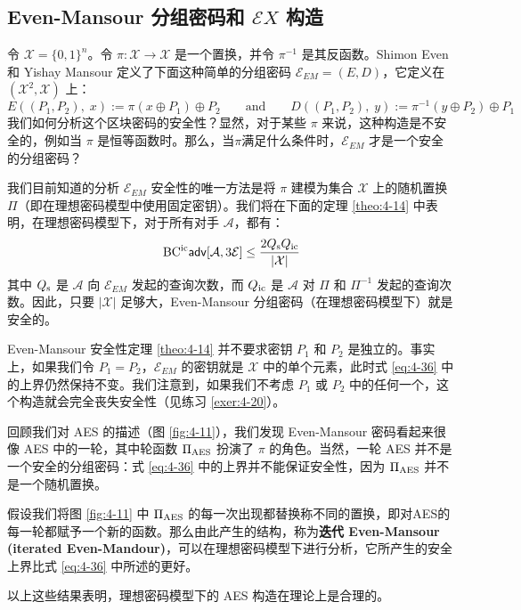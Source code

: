 \subsection{Even-Mansour 分组密码和 $\mathcal{E}X$ 构造}\label{subsec:4-7-3}

令 $\mathcal{X}=\{0,1\}^n$。令 $\pi:\mathcal{X}\to\mathcal{X}$ 是一个置换，并令 $\pi^{-1}$ 是其反函数。Shimon Even 和 Yishay Mansour 定义了下面这种简单的分组密码 $\mathcal{E}_{EM}=(E,D)$，它定义在 $(\mathcal{X}^2,\mathcal{X})$ 上：
\begin{equation}\label{eq:4-35}
E((P_1,P_2),\;x):=\pi(x\oplus P_1)\oplus P_2
\quad\quad\text{and}\quad\quad
D((P_1,P_2),\;y):=\pi^{-1}(y\oplus P_2)\oplus P_1
\end{equation}
我们如何分析这个区块密码的安全性？显然，对于某些 $\pi$ 来说，这种构造是不安全的，例如当 $\pi$ 是恒等函数时。那么，当$\pi$满足什么条件时，$\mathcal{E}_{EM}$ 才是一个安全的分组密码？

我们目前知道的分析 $\mathcal{E}_{EM}$ 安全性的唯一方法是将 $\pi$ 建模为集合 $\mathcal{X}$ 上的随机置换 $\Pi$（即在理想密码模型中使用固定密钥）。我们将在下面的定理 \ref{theo:4-14} 中表明，在理想密码模型下，对于所有对手 $\mathcal{A}$，都有：
\begin{equation}\label{eq:4-36}
{\rm BC^{ic}\mathsf{adv}}[\mathcal{A},3\mathcal{E}]\leq\frac{2Q_{\rm s}Q_{\rm ic}}{|\mathcal{X}|}
\end{equation}
其中 $Q_{\rm s}$ 是 $\mathcal{A}$ 向 $\mathcal{E}_{EM}$ 发起的查询次数，而 $Q_{\rm ic}$ 是 $\mathcal{A}$ 对 $\Pi$ 和 $\Pi^{-1}$ 发起的查询次数。因此，只要 $|\mathcal{X}|$ 足够大，Even-Mansour 分组密码（在理想密码模型下）就是安全的。

Even-Mansour 安全性定理 \ref{theo:4-14} 并不要求密钥 $P_1$ 和 $P_2$ 是独立的。事实上，如果我们令 $P_1=P_2$，$\mathcal{E}_{EM}$ 的密钥就是 $\mathcal{X}$ 中的单个元素，此时式 \ref{eq:4-36} 中的上界仍然保持不变。我们注意到，如果我们不考虑 $P_1$ 或 $P_2$ 中的任何一个，这个构造就会完全丧失安全性（见练习 \ref{exer:4-20}）。

\begin{snote}
回顾我们对 AES 的描述（图 \ref{fig:4-11}），我们发现 Even-Mansour 密码看起来很像 AES 中的一轮，其中轮函数 $\Pi_{\rm AES}$ 扮演了 $\pi$ 的角色。当然，一轮 AES 并不是一个安全的分组密码：式 \ref{eq:4-36} 中的上界并不能保证安全性，因为 $\Pi_{\rm AES}$ 并不是一个随机置换。

假设我们将图 \ref{fig:4-11} 中 $\Pi_{\rm AES}$ 的每一次出现都替换称不同的置换，即对AES的每一轮都赋予一个新的函数。那么由此产生的结构，称为\textbf{迭代 Even-Mansour (iterated Even-Mandour)}，可以在理想密码模型下进行分析，它所产生的安全上界比式 \ref{eq:4-36} 中所述的更好。

以上这些结果表明，理想密码模型下的 AES 构造在理论上是合理的。
\end{snote}

